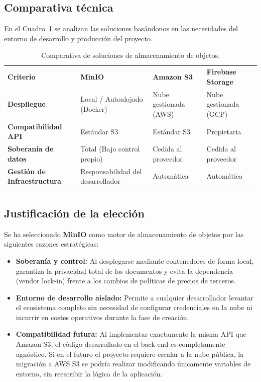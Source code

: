 \subsection*{Comparativa técnica}

En el Cuadro~\ref{tab:comparativa-os} se analizan las soluciones basándonos en las necesidades del entorno de desarrollo y producción del proyecto.

\begin{table}[H]
    \renewcommand{\arraystretch}{1.25}
    \begin{tabularx}{\textwidth}{>{\RaggedRight\arraybackslash}p{1.9cm} >{\RaggedRight\arraybackslash}X >{\RaggedRight\arraybackslash}X >{\RaggedRight\arraybackslash}X}
        \textbf{Criterio} & \textbf{MinIO} & \textbf{Amazon S3} & \textbf{Firebase Storage} \\ \lightrule
        \textbf{Despliegue} & Local / Autoalojado (Docker) & Nube gestionada (AWS) & Nube gestionada (GCP) \\ \lightrule
        \textbf{Compatibilidad API} & Estándar S3 & Estándar S3 & Propietaria \\ \lightrule
        \textbf{Soberanía de datos} & Total (Bajo control propio) & Cedida al proveedor & Cedida al proveedor \\ \lightrule
        \textbf{Gestión de Infraestructura} & Responsabilidad del desarrollador & Automática & Automática \\ \lightrule
    \end{tabularx}
    \caption{Comparativa de soluciones de almacenamiento de objetos.}
    \label{tab:comparativa-os}
\end{table}

\subsection*{Justificación de la elección}

Se ha seleccionado \textbf{MinIO} como motor de almacenamiento de objetos por las siguientes razones estratégicas:
\begin{itemize}
    \item \textbf{Soberanía y control:} Al desplegarse mediante contenedores de forma local, garantiza la privacidad total de los documentos y evita la dependencia (vendor lock-in) frente a los cambios de políticas de precios de terceros.
    \item \textbf{Entorno de desarrollo aislado:} Permite a cualquier desarrollador levantar el ecosistema completo sin necesidad de configurar credenciales en la nube ni incurrir en costes operativos durante la fase de creación.
    \item \textbf{Compatibilidad futura:} Al implementar exactamente la misma API que Amazon S3, el código desarrollado en el back-end es completamente agnóstico. Si en el futuro el proyecto requiere escalar a la nube pública, la migración a AWS S3 se podría realizar modificando únicamente variables de entorno, sin reescribir la lógica de la aplicación.
\end{itemize}


